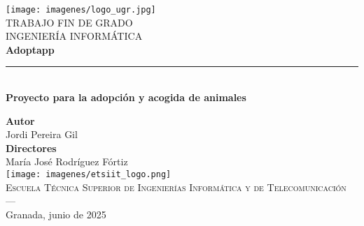 \begin{titlepage}
 
 
\newlength{\centeroffset}
\setlength{\centeroffset}{-0.5\oddsidemargin}
\addtolength{\centeroffset}{0.5\evensidemargin}
\thispagestyle{empty}

\noindent\hspace*{\centeroffset}\begin{minipage}{\textwidth}

\centering
\texttt{[image: imagenes/logo\_ugr.jpg]}\\[1.4cm]

\textsc{ \Large TRABAJO FIN DE GRADO\\[0.2cm]}
\textsc{ INGENIERÍA INFORMÁTICA}\\[1cm]
% 
{\Huge\bfseries Adoptapp\\
}
\noindent\rule[-1ex]{\textwidth}{3pt}\\[3.5ex]
{\large\bfseries Proyecto para la adopción y acogida de animales}
\end{minipage}

\vspace{2.5cm}
\noindent\hspace*{\centeroffset}\begin{minipage}{\textwidth}
\centering

\textbf{Autor}\\ {Jordi Pereira Gil}\\[2.5ex]
\textbf{Directores}\\
{María José Rodríguez Fórtiz}\\[2cm]
\texttt{[image: imagenes/etsiit\_logo.png]}\\[0.1cm]
\textsc{Escuela Técnica Superior de Ingenierías Informática y de Telecomunicación}\\
\textsc{---}\\
Granada, junio de 2025
\end{minipage}
\end{titlepage}


